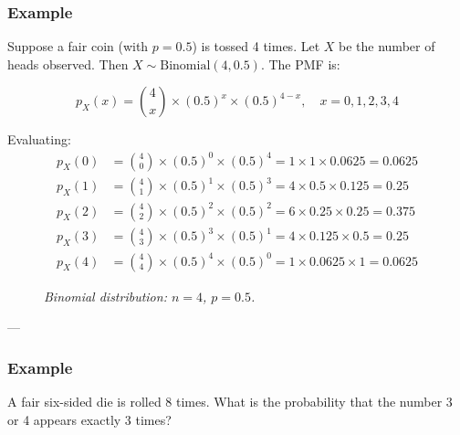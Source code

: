 \documentclass[twoside]{book}
\begin{document}
\vspace{2mm}

\subsubsection{Example}
Suppose a fair coin (with $p = 0.5$) is tossed 4 times. Let $X$ be the number of heads observed. Then $X \sim \text{Binomial}(4, 0.5)$. The PMF is:

\[
p_X(x) = \binom{4}{x} \times (0.5)^x \times (0.5)^{4 - x}, \quad x = 0, 1, 2, 3, 4
\]

Evaluating:
\[
\begin{aligned}
p_X(0) &= \binom{4}{0} \times (0.5)^0 \times (0.5)^4 = 1 \times 1 \times 0.0625 = 0.0625 \\
p_X(1) &= \binom{4}{1} \times (0.5)^1 \times (0.5)^3 = 4 \times 0.5 \times 0.125 = 0.25 \\
p_X(2) &= \binom{4}{2} \times (0.5)^2 \times (0.5)^2 = 6 \times 0.25 \times 0.25 = 0.375 \\
p_X(3) &= \binom{4}{3} \times (0.5)^3 \times (0.5)^1 = 4 \times 0.125 \times 0.5 = 0.25 \\
p_X(4) &= \binom{4}{4} \times (0.5)^4 \times (0.5)^0 = 1 \times 0.0625 \times 1 = 0.0625
\end{aligned}
\]

\begin{figure}[H]
\begin{center}
\end{center}
\caption{\textit{Binomial distribution: $n = 4$, $p = 0.5$.}}
\end{figure}

---

\subsubsection{Example}

A fair six-sided die is rolled 8 times. What is the probability that the number 3 or 4 appears exactly 3 times?
\end{document}
